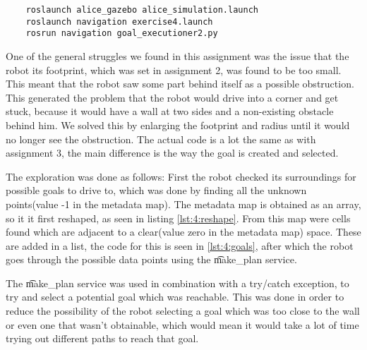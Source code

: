 
\begin{lstlisting}
	roslaunch alice_gazebo alice_simulation.launch	
	roslaunch navigation exercise4.launch
	rosrun navigation goal_executioner2.py
\end{lstlisting}

One of the general struggles we found in this assignment was the issue that the robot its footprint, which was set in assignment 2, was found to be too small. This meant that the robot saw some part behind itself as a possible obstruction. This generated the problem that the robot would drive into a corner and get stuck, because it would have a wall at two sides and a non-existing obstacle behind him. We solved this by enlarging the footprint and radius until it would no longer see the obstruction.  The actual code is a lot the same as with assignment 3, the main difference is the way the goal is created and selected.



The exploration was done as follows: First the robot checked its surroundings for possible goals to drive to, which was done by finding all the unknown points(value -1 in the metadata map). The metadata map is obtained as an array, so it it first reshaped, as seen in listing \ref{lst:4:reshape}. From this map were cells found which are adjacent to a clear(value zero in the metadata map) space. These are added in a list, the code for this is seen in \cref{lst:4:goals}, after which the robot goes through the possible data points using the \t{make_plan} service.




The \t{make_plan} service was used in combination with a try/catch exception, to try and select a potential goal which was reachable. This was done in order to reduce the possibility of the robot selecting a goal which was too close to the wall or even one that wasn't obtainable, which would mean it would take a lot of time trying out different paths to reach that goal.



